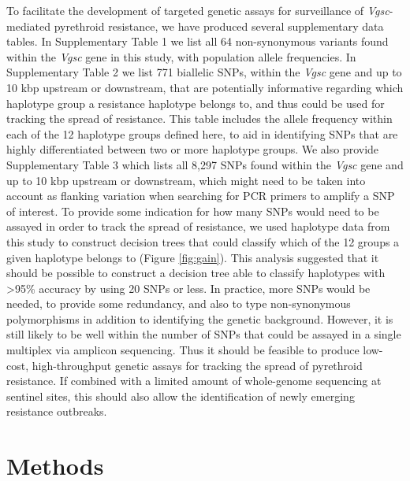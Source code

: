 \documentclass[a4paper,11pt,abstracton,hidelinks]{scrartcl}
\begin{document}
%
To facilitate the development of targeted genetic assays for surveillance of \textit{Vgsc}-mediated pyrethroid resistance, we have produced several supplementary data tables.
%
In Supplementary Table 1 we list all 64 non-synonymous variants found within the \textit{Vgsc} gene in this study, with population allele frequencies.
%
In Supplementary Table 2 we list 771 biallelic SNPs, within the \textit{Vgsc} gene and up to 10 kbp upstream or downstream, that are potentially informative regarding which haplotype group a resistance haplotype belongs to, and thus could be used for tracking the spread of resistance.
%
This table includes the allele frequency within each of the 12 haplotype groups defined here, to aid in identifying SNPs that are highly differentiated between two or more haplotype groups.
%
We also provide Supplementary Table 3 which lists all 8,297 SNPs found within the \textit{Vgsc} gene and up to 10 kbp upstream or downstream, which might need to be taken into account as flanking variation when searching for PCR primers to amplify a SNP of interest.
%
To provide some indication for how many SNPs would need to be assayed in order to track the spread of resistance, we used haplotype data from this study to construct decision trees that could classify which of the 12 groups a given haplotype belongs to (Figure \ref{fig:gain}).
%
This analysis suggested that it should be possible to construct a decision tree able to classify haplotypes with >95\% accuracy by using 20 SNPs or less.
%
In practice, more SNPs would be needed, to provide some redundancy, and also to type non-synonymous polymorphisms in addition to identifying the genetic background.
%
However, it is still likely to be well within the number of SNPs that could be assayed in a single multiplex via amplicon sequencing.
%
Thus it should be feasible to produce low-cost, high-throughput genetic assays for tracking the spread of pyrethroid resistance.
%
If combined with a limited amount of whole-genome sequencing at sentinel sites, this should also allow the identification of newly emerging resistance outbreaks.
%


\section*{Methods}


\end{document}
